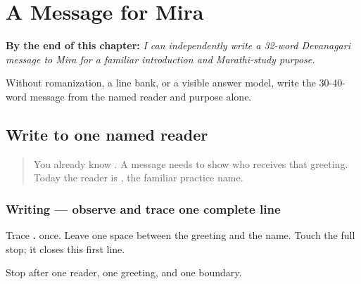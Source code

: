 
\chapter{A Message for Mira}
\label{ch:mr-a1-named-reader-message}

\begin{chapteropening}
\textbf{By the end of this chapter:} \emph{I can independently write a 32-word Devanagari message to Mira for a familiar introduction and Marathi-study purpose.}

Without romanization, a line bank, or a visible answer model, write the 30-40-word message from the named reader and purpose alone.
\end{chapteropening}

\section[namaskār Mīrā]{Write to one named reader}

\label{lesson:MR-A1M01-reader-greeting}



\begin{quote}
You already know \textbf{}. A message needs to show who receives that greeting. Today the reader is \textbf{}, the familiar practice name.
\end{quote}

\subsection*{Writing — observe and trace one complete line}
Trace \textbf{ .} once. Leave one space between the greeting and the name. Touch the full stop; it closes this first line.

\begin{tcolorbox}[breakable,colback=teal!4,colframe=teal!35!black,title={Before you move on}]
Stop after one reader, one greeting, and one boundary.
\end{tcolorbox}
